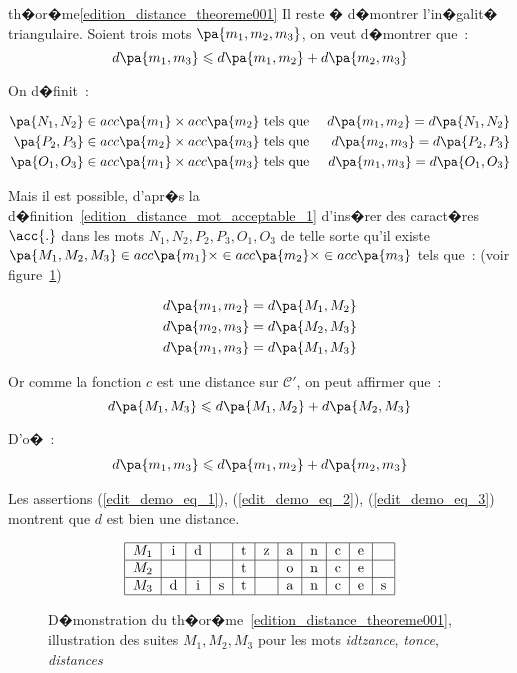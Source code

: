 \begin{xdemomine}{th�or�me}{\ref{edition_distance_theoreme001}}
Il reste � d�montrer l'in�galit� triangulaire. Soient trois mots $\pa{m_1,m_2,m_3}$, on veut d�montrer que~:
    $$
    d\pa{m_1,m_3} \leqslant d\pa{m_1,m_2} + d \pa{m_2,m_3}
    $$

On d�finit~:

    \begin{eqnarray*}
    \pa{N_1,N_2} \in acc\pa{m_1} \times acc\pa{m_2}    & \text{ tels que }     &  d\pa{m_1,m_2} = d\pa{N_1,N_2} \\
    \pa{P_2,P_3} \in acc\pa{m_2} \times acc\pa{m_3}    & \text{ tels que }     &  d\pa{m_2,m_3} = d\pa{P_2,P_3} \\
    \pa{O_1,O_3} \in acc\pa{m_1} \times acc\pa{m_3}    & \text{ tels que }     &  d\pa{m_1,m_3} = d\pa{O_1,O_3}
    \end{eqnarray*}

Mais il est possible, d'apr�s la d�finition~\ref{edition_distance_mot_acceptable_1} d'ins�rer des caract�res $\acc{.}$
dans les mots $N_1,N_2,P_2,P_3,O_1,O_3$ de telle sorte qu'il existe $\pa{M_1,M_2,M_3} \in acc\pa{m_1} \times \in
acc\pa{m_2} \times \in acc\pa{m_3}$ tels que~: (voir figure~\ref{edition_distance_demonstration})

    \begin{eqnarray*}
    d\pa{m_1,m_2} = d\pa{M_1,M_2} \\
    d\pa{m_2,m_3} = d\pa{M_2,M_3} \\
    d\pa{m_1,m_3} = d\pa{M_1,M_3}
    \end{eqnarray*}

Or comme la fonction $c$ est une distance sur $\mathcal{C}'$, on peut affirmer que~:
    $$
    d\pa{M_1,M_3} \leqslant d\pa{M_1,M_2} + d \pa{M_2,M_3}
    $$

D'o�~:
    \begin{eqnarray}
    d\pa{m_1,m_3} \leqslant d\pa{m_1,m_2} + d \pa{m_2,m_3} \label{edit_demo_eq_3}
    \end{eqnarray}

Les assertions (\ref{edit_demo_eq_1}), (\ref{edit_demo_eq_2}), (\ref{edit_demo_eq_3}) montrent que $d$ est bien une
distance.



    \begin{figure}[ht]
    \[
    \begin{tabular}{|c|c|c|c|c|c|c|c|c|c|c|} \hline
    $M_1$ & i & d &   & t & z & a & n & c & e & \\ \hline
    $M_2$ &   &   &   & t &   & o & n & c & e & \\ \hline
    $M_3$ & d & i & s & t &   & a & n & c & e & s \\ \hline
    \end{tabular}
    \]
    \caption{D�monstration du th�or�me~\ref{edition_distance_theoreme001}, illustration des suites $M_1,M_2,M_3$ pour les mots
                \textit{idtzance}, \textit{tonce}, \textit{distances}}
    \label{edition_distance_demonstration}
    \end{figure}


\end{xdemomine}








